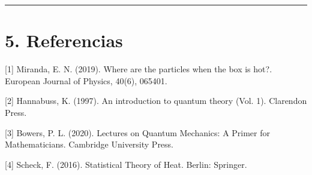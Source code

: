 \documentclass[11pt]{article}
\begin{document}
\noindent\rule{\textwidth}{0.5pt}
\section{\textbf{5. Referencias}}
\label{sec:org0efe1bd}
{[}1] Miranda, E. N. (2019). Where are the particles when the box is hot?.
European Journal of Physics, 40(6), 065401.

{[}2] Hannabuss, K. (1997). An introduction to quantum theory (Vol. 1).
Clarendon Press.

{[}3] Bowers, P. L. (2020). Lectures on Quantum Mechanics: A Primer for
Mathematicians. Cambridge University Press.

{[}4] Scheck, F. (2016). Statistical Theory of Heat. Berlin: Springer.
\end{document}
